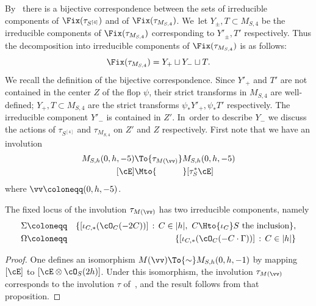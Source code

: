 By~\cite[\S 5.1]{involutions1} there is a bijective correspondence between the sets of irreducible components of $\Fix(\tau_{S^{[4]}})$ and of $\Fix(\tau_{M_{S,4}})$. We~let $Y_{\pm},T\subset M_{S,4}$ be the irreducible components of $\Fix(\tau_{M_{S,4}})$ corresponding to
$Y'_{\pm},T'$ respectively.
Thus the decomposition into irreducible components of $\Fix(\tau_{M_{S,4}})$ is as follows:
\begin{equation*}
\Fix(\tau_{M_{S,4}})=Y_+\sqcup Y_-\sqcup T.
\end{equation*}
We recall the definition of the bijective correspondence. Since $Y'_{+}$ and $T'$ are not contained in the center $Z$ of the flop $\psi$, their strict transforms in $M_{S,4}$ are well-defined;
$Y_{+},T\subset M_{S,4}$ are the strict transforms $\psi_*Y'_{+},\psi_*T'$ respectively. The irreducible component $Y'_{-}$ is contained in $Z'$. In~order to describe $Y_{-}$ we discuss the actions of $\tau_{S^{[4]}}$ and $\tau_{M_{S,4}}$ on $Z'$ and $Z$ respectively. First note that we have an involution
\begin{equation*}\label{azionequattro}
\begin{aligned}
M_{S,h}(0,h,-5) & \To{\tau_{M(\vv)}} M_{S,h}(0,h,-5) \\
[\cE] & \Mto{\hphantom{\tau_{M(\vv)}}} [\tau_S^{*}\cE]
\end{aligned}
\end{equation*}
where $\vv\coloneqq (0,h,-5)$.

\begin{prop}\label{prop:fissidimdue}
The fixed locus of the involution $\tau_{M(\vv)}$ has two irreducible components, namely
\begin{eqnarray*}
\Sigma & \coloneqq & \{[\iota_{C,*}(\cO_C(-2C))]\,:\, C\in|h|,\
\text{$C\Hto{\iota_{C}} S$ the inclusion}\}, \\
\Omega & \coloneqq & \{[\iota_{C,*}(\cO_C(-C\cdot\Gamma))]\,:\, C\in|h|\}
\end{eqnarray*}
\end{prop}

\begin{proof}
One defines an isomorphism $M(\vv)\To{\sim} M_{S,h}(0,h,-1)$ by mapping $[\cE]$ to $[\cE\otimes\cO_S(2h)]$. Under this isomorphism, the involution $\tau_{M(\vv)}$ corresponds to the involution
$\tau$ of~\cite[Prop.\,4.1]{involutions1}, and the result follows from that proposition.
\end{proof}

